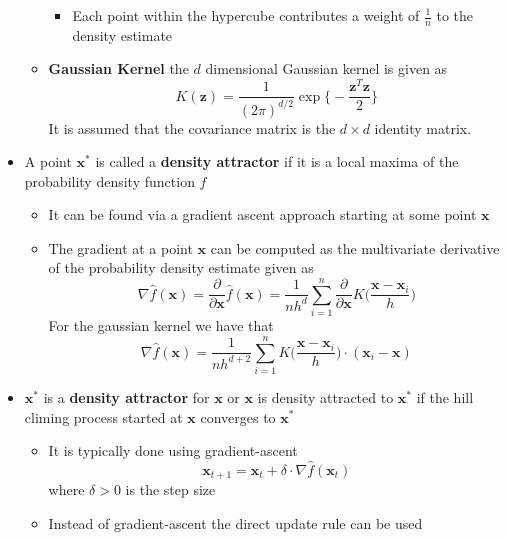 \documentclass[a4, english]{article}
\begin{document}
\begin{itemize}
\begin{itemize}
\begin{itemize}
  	\item Each point within the hypercube contributes a weight of $\frac1n$ to the density estimate 
  \end{itemize}
    \item \textbf{Gaussian Kernel} the $d$ dimensional Gaussian kernel is given as 
    \begin{equation*}
      K(\pmb z) = \frac1{(2\pi)^{d/2}}\exp \bigg \{-\frac{\pmb z^T \pmb z}2 \bigg \}
    \end{equation*}
    It is assumed that the covariance matrix is the $d \times d$ identity matrix.
  \end{itemize}
	\item A point $\pmb x^*$ is called a \textbf{density attractor} if it is a local maxima of the probability density function $f$ 
  \begin{itemize}
  	\item It can be found via a gradient ascent approach starting at some point $\pmb x$ 
  	\item The gradient at a point $\pmb x$ can be computed as the multivariate derivative of the probability density estimate given as 
    \begin{equation*}
      \nabla \hat f(\pmb x) = \frac{\partial}{\partial \pmb x} \hat f(\pmb x) = \frac1{nh^d} \sum_{i=1}^n \frac{\partial}{\partial \pmb x} K\bigg(\frac{\pmb x-\pmb x_i}h\bigg)
    \end{equation*}
    For the gaussian kernel we have that
    \begin{equation*}
      \nabla \hat f(\pmb x) = \frac1{nh^{d+2}} \sum_{i=1}^n K \bigg(\frac{\pmb x-\pmb x_i}h\bigg) \cdot (\pmb x_i-\pmb x)
    \end{equation*}
  \end{itemize}
  \item $\pmb x^*$ is a \textbf{density attractor} for $\pmb x$ or $\pmb x$ is density attracted to $\pmb x^*$ if the hill climing process started at $\pmb x$ converges to $\pmb x^*$
  \begin{itemize}
  	\item It is typically done using gradient-ascent 
    \begin{equation*}
      \pmb x_{t+1} = \pmb x_t + \delta \cdot \nabla \hat f (\pmb x_t)
    \end{equation*}
    where $\delta > 0$ is the step size
    \item Instead of gradient-ascent the direct update rule can be used
    \begin{equation*}

\end{equation*}
\end{itemize}
\end{itemize}
\end{document}
